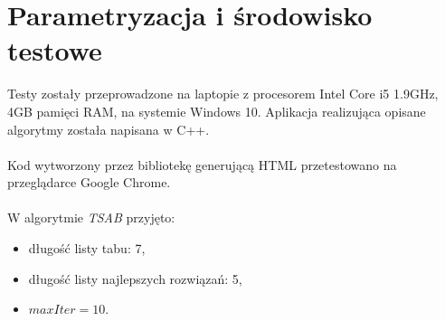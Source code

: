 \documentclass[printmode,oneside]{mgr}
\begin{document}
\section{Parametryzacja i środowisko testowe}
Testy zostały przeprowadzone na laptopie z procesorem Intel Core i5 1.9GHz, 4GB pamięci RAM, na systemie Windows 10. Aplikacja realizująca opisane algorytmy została napisana w C++.\\\\
Kod wytworzony przez bibliotekę generującą HTML przetestowano na przeglądarce Google Chrome.\\\\
W algorytmie \emph{TSAB} przyjęto:
\begin{itemize}
 	\item długość listy tabu: 7,
 	\item długość listy najlepszych rozwiązań: 5,
 	\item $maxIter = 10$.
\end{itemize}
%
\end{document}

